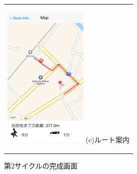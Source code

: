\begin{figure}[htbp]
\begin{center}
\begin{tabular}{c}
      \begin{minipage}{0.33\hsize}
        \begin{center}
\includegraphics[width=4cm, bb=0 0 320 548]{5.4_route.png}
          \hspace{1cm} (c)ルート案内
        \end{center}
      \end{minipage}

    \end{tabular}
    \caption{第2サイクルの完成画面}
    \label{fig:lena}
  \end{center}
\end{figure}

